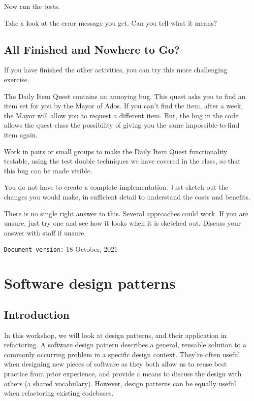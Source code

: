 \documentclass[
]{book}
\begin{document}
Now run the tests.

Take a look at the error message you get. Can you tell what it means?

\hypertarget{next}{%
\section{All Finished and Nowhere to Go?}\label{next}}

If you have finished the other activities, you can try this more challenging exercise.

The Daily Item Quest contains an annoying bug. This quest asks you to find an item set for you by the Mayor of Ados. If you can't find the item, after a week, the Mayor will allow you to request a different item. But, the bug in the code allows the quest class the possibility of giving you the same impossible-to-find item again.

Work in pairs or small groups to make the Daily Item Quest functionality testable, using the test double techniques we have covered in the class, so that this bug can be made visible.

You do not have to create a complete implementation. Just sketch out the changes you would make, in sufficient detail to understand the costs and benefits.

There is no single right answer to this. Several approaches could work. If you are unsure, just try one and see how it looks when it is sketched out. Discuss your answer with staff if unsure.

\texttt{Document\ version:} 18 October, 2021

\hypertarget{patterning}{%
\chapter{Software design patterns}\label{patterning}}

\hypertarget{introduction}{%
\section{Introduction}\label{introduction}}

In this workshop, we will look at design patterns, and their application in refactoring. A software design pattern describes a general, reusable solution to a commonly occurring problem in a specific design context. They're often useful when designing new pieces of software as they both allow us to reuse best practice from prior experience, and provide a means to discuss the design with others (a shared vocabulary). However, design patterns can be equally useful when refactoring existing codebases.
\end{document}

